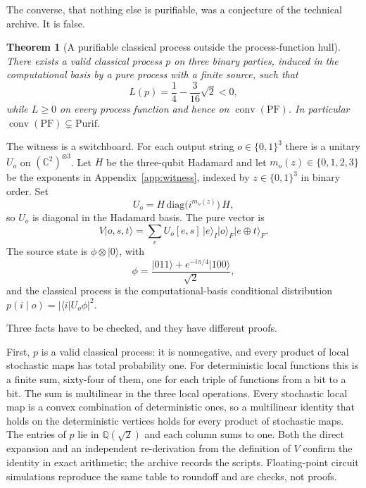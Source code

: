 \documentclass[11pt]{article}
\newtheorem{theorem}{Theorem}
\theoremstyle{definition}
\theoremstyle{remark}
\newcommand{\ket}[1]{\lvert #1\rangle}
\newcommand{\bra}[1]{\langle #1\rvert}
\newcommand{\conv}{\operatorname{conv}}
\newcommand{\PF}{\mathrm{PF}}
\newcommand{\Purif}{\mathrm{Purif}}
\begin{document}
The converse, that nothing else is purifiable, was a conjecture of the technical archive. It is false.

\begin{theorem}[A purifiable classical process outside the process-function hull]
\label{thm:sep}
There exists a valid classical process \(p\) on three binary parties, induced in the computational basis by a pure process with a finite source, such that
\begin{equation}
\label{eq:L}
L(p)=\frac14-\frac{3}{16}\sqrt{2}<0,
\end{equation}
while \(L\ge 0\) on every process function and hence on \(\conv(\PF)\). In particular \(\conv(\PF)\subsetneq\Purif\).
\end{theorem}

The witness is a switchboard. For each output string \(o\in\{0,1\}^3\) there is a unitary \(U_o\) on \((\mathbb{C}^2)^{\otimes 3}\). Let \(H\) be the three-qubit Hadamard and let \(m_o(z)\in\{0,1,2,3\}\) be the exponents in Appendix~\ref{app:witness}, indexed by \(z\in\{0,1\}^3\) in binary order. Set
\begin{equation}
\label{eq:Uo}
U_o=H\,\mathrm{diag}\bigl(i^{m_o(z)}\bigr)\,H,
\end{equation}
so \(U_o\) is diagonal in the Hadamard basis. The pure vector is
\begin{equation}
\label{eq:V}
V\ket{o,s,t}
=\sum_e U_o[e,s]\,\ket{e}_I\ket{o}_F\ket{e\oplus t}_F.
\end{equation}
The source state is \(\phi\otimes\ket{0}\), with
\begin{equation}
\label{eq:phi}
\phi=\frac{\ket{011}+e^{-i\pi/4}\ket{100}}{\sqrt{2}},
\end{equation}
and the classical process is the computational-basis conditional distribution \(p(i\mid o)=\lvert\bra{i}U_o\phi\rvert^2\).

Three facts have to be checked, and they have different proofs.

First, \(p\) is a valid classical process: it is nonnegative, and every product of local stochastic maps has total probability one. For deterministic local functions this is a finite sum, sixty-four of them, one for each triple of functions from a bit to a bit. The sum is multilinear in the three local operations. Every stochastic local map is a convex combination of deterministic ones, so a multilinear identity that holds on the deterministic vertices holds for every product of stochastic maps. The entries of \(p\) lie in \(\mathbb{Q}(\sqrt{2})\) and each column sums to one. Both the direct expansion and an independent re-derivation from the definition of \(V\) confirm the identity in exact arithmetic; the archive records the scripts. Floating-point circuit simulations reproduce the same table to roundoff and are checks, not proofs.
\end{document}
